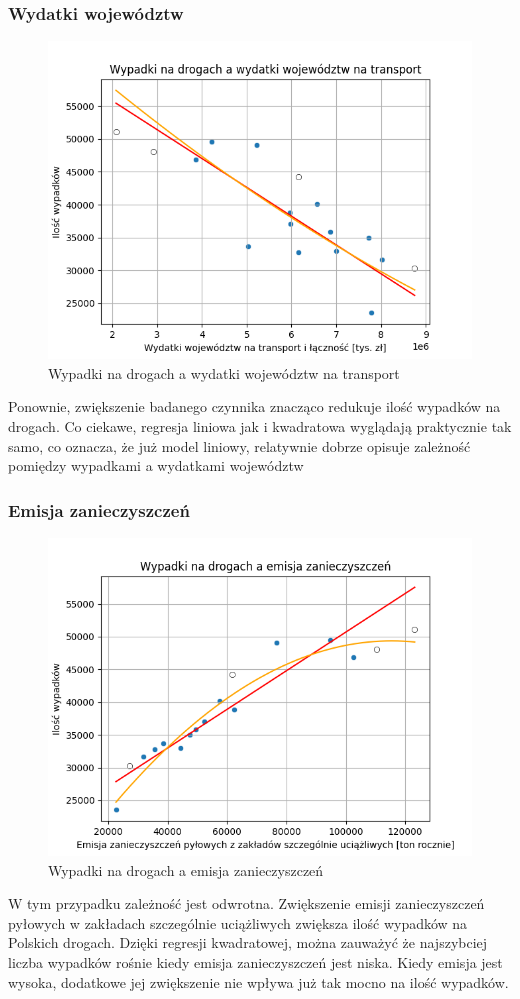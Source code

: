\documentclass[10pt]{article}
\begin{document}
\subsubsection{Wydatki województw}
\begin{figure}[h]
\begin{center}
\includegraphics[width=0.5\linewidth]{images/plots/woj.png}
\caption{Wypadki na drogach a wydatki województw na transport}
\end{center}
\end{figure}
Ponownie, zwiększenie badanego czynnika znacząco redukuje ilość wypadków na drogach. Co ciekawe, regresja liniowa jak i kwadratowa wyglądają praktycznie tak samo, co oznacza, że już model liniowy, relatywnie dobrze opisuje zależność pomiędzy wypadkami a wydatkami województw

\subsubsection{Emisja zanieczyszczeń}
\begin{figure}[h]
\begin{center}
\includegraphics[width=0.5\linewidth]{images/plots/emisja.png}
\caption{Wypadki na drogach a emisja zanieczyszczeń}
\end{center}
\end{figure}
W tym przypadku zależność jest odwrotna. Zwiększenie emisji zanieczyszczeń pyłowych w zakładach szczególnie uciążliwych zwiększa ilość wypadków na Polskich drogach. Dzięki regresji kwadratowej, można zauważyć że najszybciej liczba wypadków rośnie kiedy emisja zanieczyszczeń jest niska. Kiedy emisja jest wysoka, dodatkowe jej zwiększenie nie wpływa już tak mocno na ilość wypadków.
\end{document}
